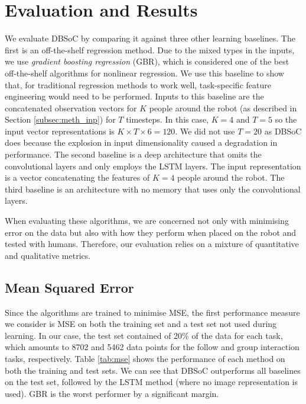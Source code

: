 \documentclass[letterpaper, 10 pt, conference]{ieeeconf}
\begin{document}
\section{Evaluation and Results}
We evaluate DBSoC by comparing it against three other learning baselines. The first is an off-the-shelf regression method. Due to the mixed types in the inputs, we use \emph{gradient boosting regression} (GBR), which  is considered one of the best off-the-shelf algorithms for nonlinear regression. We use this baseline to show that, for traditional regression methods to work well, task-specific feature engineering would need to be performed. Inputs to this baseline are the concatenated observation vectors for $K$ people around the robot (as described in Section \ref{subsec:meth_inp}) for $T$ timesteps. In this case, $K=4$ and $T =5$ so the input vector representations is $K\times T \times 6 = 120$. We did not use $T=20$ as DBSoC does because the explosion in input dimensionality caused a degradation in performance. The second baseline is a deep architecture that omits the convolutional layers and only employs the LSTM layers. The input representation is a vector concatenating the features of $K=4$ people around the robot. The third baseline is an architecture with no memory that uses only the convolutional layers.

When evaluating these algorithms, we are concerned not only with minimising error on the data but also with how they perform when placed on the robot and tested with humans. Therefore, our evaluation relies on a mixture of quantitative and qualitative metrics. 

\subsection{Mean Squared Error}
Since the algorithms are trained to minimise MSE, the first performance measure we consider is MSE on both the training set and a test set not used during learning. In our case, the test set contained of 20\% of the data for each task, which amounts to 8702 and 5462 data points for the follow and group interaction tasks, respectively. Table \ref{tab:mse} shows the performance of each method on both the training and test sets. We can see that DBSoC outperforms all baselines on the test set, followed by the LSTM method (where no image representation is used). GBR is the worst performer by a significant margin.

\end{document}
